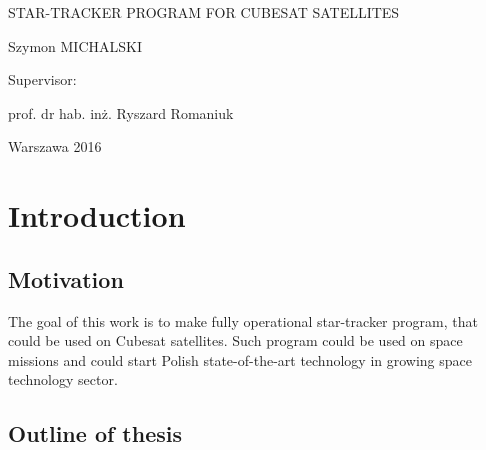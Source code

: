 \documentclass[12pt,a4paper,oneside]{article}
\begin{document}
\begin{titlepage}
	\vspace{0.2cm}
	{\huge STAR-TRACKER PROGRAM FOR CUBESAT SATELLITES\par}
	\vspace{0.2cm}
	{\large Szymon MICHALSKI\par}
	\vspace{3cm}
	\begin{flushright}
	Supervisor:\par
	prof. dr hab. inż. Ryszard Romaniuk\par
	\end{flushright}
	\vspace{6cm}
	{\large Warszawa 2016\par}
\end{titlepage}

\setcounter{page}{2}


\newpage
\setlength{\parindent}{1cm}
\setlength{\parskip}{\baselineskip}%


\printnomenclature

\newpage
\cite{jenssen2011comparison}
\cite{valenti2015keeping}
\cite{delabie2012highly}
\cite{jalabert2011optimization}
\cite{felikson2011orbit}
\cite{knutson2012fast}
\cite{rose2003star}
\cite{mortari2002starnav}


\section{Introduction}
\subsection{Motivation}
The goal of this work is to make fully operational star-tracker program, that could be used on Cubesat satellites. Such program could be used on space missions and could start Polish state-of-the-art technology in growing space technology sector.

\subsection{Outline of thesis}
\end{document}
